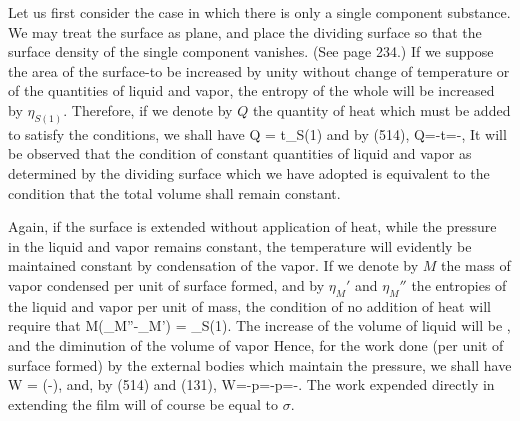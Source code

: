 \documentclass[12pt]{memoir}
\begin{document}
{Let us first consider the case in which there is only a single component substance.  We may treat the surface as plane, and place the dividing surface so that the surface density of the single component vanishes. (See page 234.) If we suppose the area of the surface-to be increased by unity without change of temperature or of the quantities of liquid and vapor, the entropy of the whole will be increased by $\eta_{S(1)}$. Therefore, if we denote by $Q$ the quantity of heat which must be added to satisfy the conditions, we shall have
\eqs Q = t\eta_{S(1)}   \label{586}  \eqe
and by (514),
\eqs Q=-t=-, \label{587} \eqe
It will be observed that the condition of constant quantities of liquid and vapor as determined by the dividing surface which we have adopted is equivalent to the condition that the total volume shall remain constant.

Again, if the surface is extended without application of heat, while the pressure in the liquid and vapor remains constant, the temperature will evidently be maintained constant by condensation of the vapor. If we denote by $M$ the mass of vapor condensed per unit of surface formed, and by $\eta_M'$ and $\eta_M''$ the entropies of the liquid and vapor per unit of mass, the condition of no addition of heat will require that
\eqs M(\eta_M''-\eta_M') = \eta_{S(1)}. \label{588} \eqe
The increase of the volume of liquid will be
\eqs {},\label{589} \eqe
and the diminution of the volume of vapor
\eqs {} \label{590} \eqe
Hence, for the work done (per unit of surface formed) by the external bodies which maintain the pressure, we shall have
\eqs W = \left(-\right), \label{591} \eqe
and, by (514) and (131),
\eqs W=-p=-p=-.     \label{592} \eqe
The work expended directly in extending the film will of course be equal to $\sigma$.

}
\end{document}
